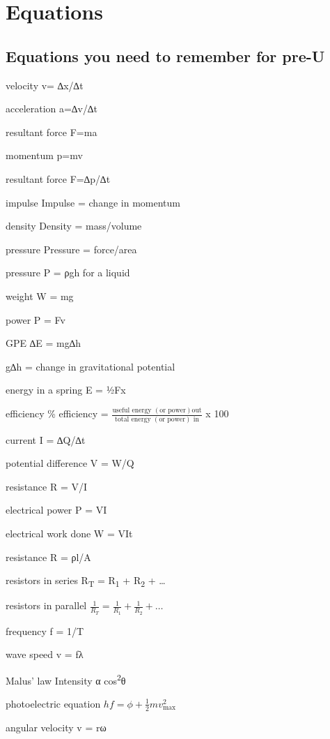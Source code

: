\documentclass[main.tex]{subfiles}
\begin{document}
\chapter{Equations}

\section{Equations you need to remember for pre-U}

velocity v= ∆x/∆t

acceleration a=∆v/∆t

resultant force F=ma

momentum p=mv

resultant force F=∆p/∆t

impulse Impulse = change in momentum

density Density = mass/volume

pressure Pressure = force/area

pressure P = ρgh for a liquid

weight W = mg

power P = Fv

GPE ∆E = mg∆h

g∆h = change in gravitational potential

energy in a spring E = ½Fx

efficiency \% efficiency =
\(\frac{\text{useful\ energy\ }\left( \text{or\ power} \right)\text{out}}{\text{total\ energy\ }\left( \text{or\ power} \right)\text{\ in}}\)
x 100

current I = ∆Q/∆t

potential difference V = W/Q

resistance R = V/I

electrical power P = VI

electrical work done W = VIt

resistance R = ρl/A

resistors in series R­\textsubscript{T} = R\textsubscript{1} +
R\textsubscript{2} + \ldots{}

resistors in parallel
\(\frac{1}{R_{T}} = \frac{1}{R_{1}} + \frac{1}{R_{2}} + \ldots\)

frequency f = 1/T

wave speed v = fλ

Malus' law Intensity α cos\textsuperscript{2}θ

photoelectric equation \(hf = \phi + \frac{1}{2}mv_{\max}^{2}\)

angular velocity v = rω
\end{document}
